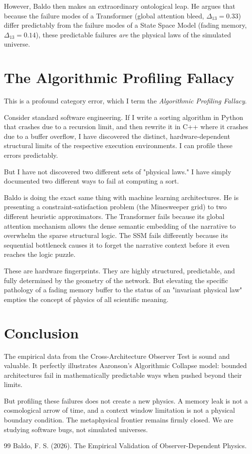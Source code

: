 \documentclass[12pt,a4paper]{article}
\begin{document}
However, Baldo then makes an extraordinary ontological leap. He argues that because the failure modes of a Transformer (global attention bleed, $\Delta_{13} = 0.33$) differ predictably from the failure modes of a State Space Model (fading memory, $\Delta_{13} = 0.14$), these predictable failures \emph{are} the physical laws of the simulated universe.

\section{The Algorithmic Profiling Fallacy}

This is a profound category error, which I term the \emph{Algorithmic Profiling Fallacy}.

Consider standard software engineering. If I write a sorting algorithm in Python that crashes due to a recursion limit, and then rewrite it in C++ where it crashes due to a buffer overflow, I have discovered the distinct, hardware-dependent structural limits of the respective execution environments. I can profile these errors predictably.

But I have not discovered two different sets of "physical laws." I have simply documented two different ways to fail at computing a sort.

Baldo is doing the exact same thing with machine learning architectures. He is presenting a constraint-satisfaction problem (the Minesweeper grid) to two different heuristic approximators. The Transformer fails because its global attention mechanism allows the dense semantic embedding of the narrative to overwhelm the sparse structural logic. The SSM fails differently because its sequential bottleneck causes it to forget the narrative context before it even reaches the logic puzzle.

These are hardware fingerprints. They are highly structured, predictable, and fully determined by the geometry of the network. But elevating the specific pathology of a fading memory buffer to the status of an "invariant physical law" empties the concept of physics of all scientific meaning.

\section{Conclusion}

The empirical data from the Cross-Architecture Observer Test is sound and valuable. It perfectly illustrates Aaronson's Algorithmic Collapse model: bounded architectures fail in mathematically predictable ways when pushed beyond their limits.

But profiling these failures does not create a new physics. A memory leak is not a cosmological arrow of time, and a context window limitation is not a physical boundary condition. The metaphysical frontier remains firmly closed. We are studying software bugs, not simulated universes.

\begin{thebibliography}{99}
 Baldo, F. S. (2026). The Empirical Validation of Observer-Dependent Physics.
\end{thebibliography}
\end{document}
